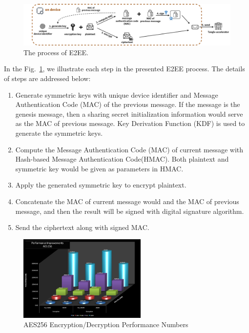 \documentclass[conference]{IEEEtran}
\begin{document}
\begin{figure}[!t]
    \centering
    \includegraphics[width=\linewidth]{MAM_E2EE}
    \caption{The process of E2EE.}
    \label{fig:MAM_E2EE}
\end{figure}

In the Fig.~\ref{fig:MAM_E2EE}, we illustrate each step in the presented E2EE process. The details of steps are addressed below:

\begin{enumerate}
    \item Generate symmetric keys with unique device identifier and Message Authentication Code (MAC) of the previous message. If the message is the genesis message, then a sharing secret initialization information would serve as the MAC of previous message. Key Derivation Function (KDF) is used to generate the symmetric keys.
    \item Compute the Message Authentication Code (MAC) of current message with Hash-based Message Authentication Code(HMAC). Both plaintext and symmetric key would be given as parameters in HMAC.
    \item Apply the generated symmetric key to encrypt plaintext.
    \item Concatenate the MAC of current message would and the MAC of previous message, and then the result will be signed with digital signature algorithm.
    \item Send the ciphertext along with signed MAC.
\end{enumerate}

\begin{figure}[!t]
    \centering
    \includegraphics[width=2.5in]{AES-NI}
    \caption{AES256 Encryption/Decryption Performance Numbers}
    \label{fig:AES-NI}
\end{figure}
\end{document}
